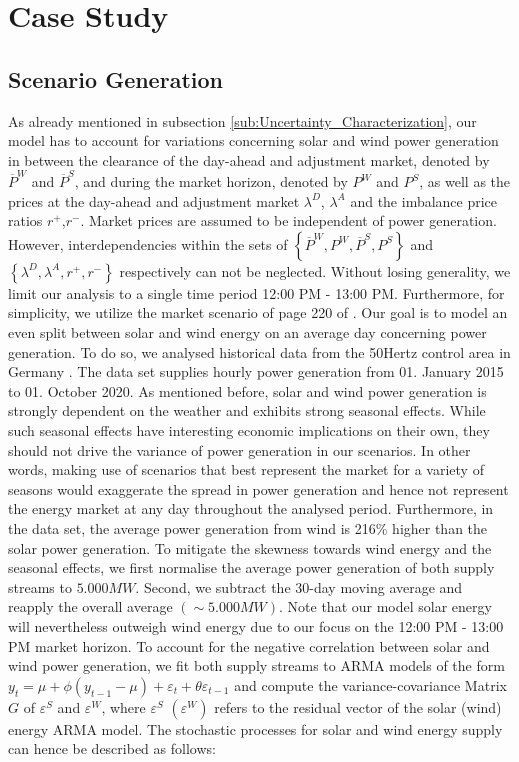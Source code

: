 
\section{Case Study}

\subsection{Scenario Generation}
As already mentioned in subsection \ref{sub:Uncertainty_Characterization}, our model has to account for variations concerning solar and wind power generation in between the clearance of the day-ahead and adjustment market, denoted by $\overline{P}^{W}$ and $\overline{P}^{S}$, and during the market horizon, denoted by ${P}^{W}$ and ${P}^{S}$, as well as the prices at the day-ahead and adjustment market $\lambda^D$, $\lambda^A$ and the imbalance price ratios $r^+$,$r^-$. Market prices are assumed to be independent of power generation. However, interdependencies within the sets of $\left\lbrace\overline{P}^{W},{P}^{W},\overline{P}^{S},{P}^{S}\right\rbrace$ and $\left\lbrace\lambda^D,\lambda^A,r^+,r^-\right\rbrace$ respectively can not be neglected. Without losing generality, we limit our analysis to a single time period 12:00 PM - 13:00 PM. Furthermore, for simplicity, we utilize the market scenario of page 220 of \cite{Conejo10}. %
Our goal is to model an even split between solar and wind energy on an average day concerning power generation. To do so, we analysed historical data from the 50Hertz control area in Germany  \cite{url}. The data set supplies hourly power generation from 01. January 2015 to 01. October 2020. As mentioned before, solar and wind power generation is strongly dependent on the weather and exhibits strong seasonal effects. While such seasonal effects have interesting economic implications on their own, they should not drive the variance of power generation in our scenarios. In other words, making use of scenarios that best represent the market for a variety of seasons would exaggerate the spread in power generation and hence not represent the energy market at any day throughout the analysed period. Furthermore, in the data set, the average power generation from wind is 216\% higher than the solar power generation. To mitigate the skewness towards wind energy and the seasonal effects, we first normalise the average power generation of both supply streams to $5.000 MW$. Second, we subtract the 30-day moving average and reapply the overall average $\left(\sim 5.000 MW\right)$. Note that our model solar energy will nevertheless outweigh wind energy due to our focus on the 12:00 PM - 13:00 PM market horizon. To account for the negative correlation between solar and wind power generation, we fit both supply streams to ARMA models of the form $y_t = \mu + \phi \left(y_{t-1}-\mu\right)+\varepsilon_t + \theta\varepsilon_{t-1}$ and compute the variance-covariance Matrix $G$ of $\varepsilon^S$ and $\varepsilon^W$, where $\varepsilon^S$ $\left(\varepsilon^W\right)$ refers to the residual vector of the solar (wind) energy ARMA model. The stochastic processes 
for solar and wind energy supply can hence be described as follows:

